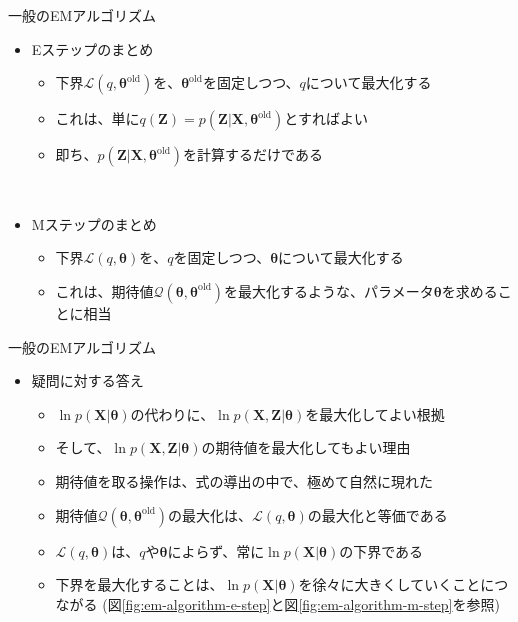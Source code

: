 \documentclass[dvipdfmx,notheorems,t]{beamer}
\begin{document}
\begin{frame}{一般のEMアルゴリズム}

\begin{itemize}
	\item \alert{Eステップ}のまとめ
	\begin{itemize}
		\item 下界$\mathcal{L}(q, \bm{\theta}^\mathrm{old})$を、\color{red}$\bm{\theta}^\mathrm{old}$を固定しつつ、$q$について最大化\normalcolor する
		\item これは、単に$q(\bm{Z}) = p(\bm{Z} | \bm{X}, \bm{\theta}^\mathrm{old})$とすればよい
		\item 即ち、$p(\bm{Z} | \bm{X}, \bm{\theta}^\mathrm{old})$を計算するだけである
	\end{itemize} \
	
	\item \alert{Mステップ}のまとめ
	\begin{itemize}
		\item 下界$\mathcal{L}(q, \bm{\theta})$を、\color{red}$q$を固定しつつ、$\bm{\theta}$について最大化\normalcolor する
		\item これは、期待値$\mathcal{Q}(\bm{\theta}, \bm{\theta}^\mathrm{old})$を最大化するような、パラメータ$\bm{\theta}$を求めることに相当
	\end{itemize}
\end{itemize}

\end{frame}

\begin{frame}{一般のEMアルゴリズム}

\begin{itemize}
	\item 疑問に対する答え
	\begin{itemize}
		\item $\ln p(\bm{X} | \bm{\theta})$の代わりに、$\ln p(\bm{X}, \bm{Z} | \bm{\theta})$を最大化してよい根拠
		\item そして、$\ln p(\bm{X}, \bm{Z} | \bm{\theta})$の期待値を最大化してもよい理由
		\newline
		\item 期待値を取る操作は、式の導出の中で、極めて自然に現れた
		\item 期待値$\mathcal{Q}(\bm{\theta}, \bm{\theta}^\mathrm{old})$の最大化は、$\mathcal{L}(q, \bm{\theta})$の最大化と等価である
		\item $\mathcal{L}(q, \bm{\theta})$は、$q$や$\bm{\theta}$によらず、常に$\ln p(\bm{X} | \bm{\theta})$の下界である
		\item 下界を最大化することは、$\ln p(\bm{X} | \bm{\theta})$を徐々に大きくしていくことにつながる (図\ref{fig:em-algorithm-e-step}と図\ref{fig:em-algorithm-m-step}を参照)
	\end{itemize}
\end{itemize}

\end{frame}
\end{document}
